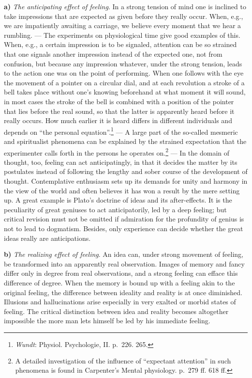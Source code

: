 \documentclass[12pt,a4paper]{book}
\newcommand{\opage}[1]{\marginnote{\footnotesize\textit{[#1]}}}
\begin{document}
\textbf{a)} \emph{The anticipating effect of feeling}. In a strong
tension of mind one is inclined to take impressions that are expected
as given before they really occur. When, e.g., we are impatiently
awaiting a carriage, we believe every moment that we hear a rumbling.
--- The experiments on physiological time give good examples of this.
When, e.g., a certain impression is to be signaled, attention can be so
strained that one signals another impression instead of the expected
one, not from confusion, but because any impression whatever, under the
strong tension, leads to the action one was on the point of performing.
When one follows with the eye the movement of a pointer
\opage{359}on a circular dial, and at each revolution a stroke of a bell
takes place without one's knowing beforehand at what moment it will
sound, in most cases the stroke of the bell is combined with a position
of the pointer that lies before the real sound, so that the latter is
apparently heard before it really occurs. How much earlier it is heard
differs in different individuals and depends on ``the
personal equation''.\footnote{\emph{Wundt}: Physiol. Psychologie, II.
p.~226. 265.} --- A large part of the so-called mesmeric and
spiritualist phenomena can be explained by the strained expectation that
the experimenter calls forth in the persons he operates
on.\footnote{A detailed investigation of the influence of ``expectant
attention'' in such phenomena is found in Carpenter's Mental physiology.
p.~279 ff. 618 ff.} --- In the domain of thought, too, feeling can act
anticipatingly, in that it decides the matter by its postulates instead
of following the lengthy and sober course of the development of
thought. Contemplative enthusiasm sets up its demands for unity and
harmony in the view of the world and often believes it has won a result
by the mere setting up. A great example is Plato's doctrine of ideas
and its after-effects. It is the peculiarity of great geniuses to act
anticipatorily, led by a deep feeling; but critical revision must not
be omitted if admiration for the profundity of genius is not to lead to
dogmatism. Besides, only experience can decide whether the great ideas
really are anticipations.

\textbf{b)} \emph{The realizing effect of feeling}. An idea can, under
strong movement of feeling, be transformed into an apparently real
observation. Images of memory and fancy differ only in degree from real
observations, and a strong feeling can efface this difference of
degree. When the memory is bound up with a feeling akin to the original
feeling, the difference between ideality and reality is at once
diminished. Illusions and hallucinations arise especially in very
exalted or morbid states of feeling. The critical distinction between
idea and reality becomes altogether impossible the more man lets
himself be led by his immediate feeling.
\end{document}
